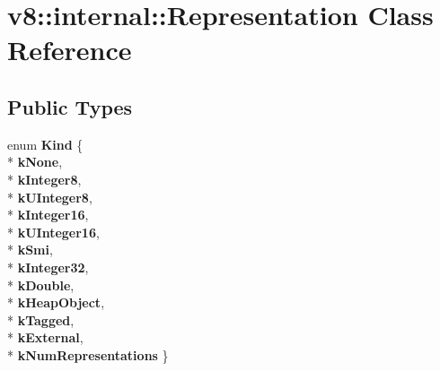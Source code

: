 \hypertarget{classv8_1_1internal_1_1_representation}{}\section{v8\+:\+:internal\+:\+:Representation Class Reference}
\label{classv8_1_1internal_1_1_representation}
\subsection*{Public Types}
\begin{DoxyCompactItemize}
\item 
enum {\bfseries Kind} \{ \\*
{\bfseries k\+None}, 
\\*
{\bfseries k\+Integer8}, 
\\*
{\bfseries k\+U\+Integer8}, 
\\*
{\bfseries k\+Integer16}, 
\\*
{\bfseries k\+U\+Integer16}, 
\\*
{\bfseries k\+Smi}, 
\\*
{\bfseries k\+Integer32}, 
\\*
{\bfseries k\+Double}, 
\\*
{\bfseries k\+Heap\+Object}, 
\\*
{\bfseries k\+Tagged}, 
\\*
{\bfseries k\+External}, 
\\*
{\bfseries k\+Num\+Representations}
 \}\hypertarget{classv8_1_1internal_1_1_representation_a08dbab898351309de7fa1fded4476d00}{}\label{classv8_1_1internal_1_1_representation_a08dbab898351309de7fa1fded4476d00}

\end{DoxyCompactItemize}
